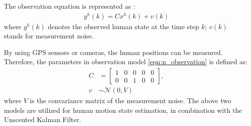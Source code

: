 \documentclass[letterpaper, 10 pt, conference]{ieeeconf}
\begin{document}
	
	
	
	
	
	
	The observation equation is represented as : 
	\begin{subequations}
		\begin{align}
			y^h(k)=Cx^h(k)+v(k)\label{eqn:n_observation}
		\end{align}
	\end{subequations}
	where $y^h(k)$ denotes the observed human state at the time step $k$; $v(k)$ stands for measurement noise. 
	
	By using GPS sensors or cameras, the human positions can be measured.
	Therefore, the parameters in observation model \cref{eqn:n_observation} is defined as:
	\begin{subequations}
		\begin{align}
			C&=\left[
			\begin{array}{ccccc}
				1& 0& 0& 0& 0\\
				0& 0& 1& 0& 0
			\end{array}\right],\label{eqn:C}\\
			v&\sim\mathcal{N}(0,V)\label{eqn:meas_noise}
		\end{align}
	\end{subequations}
	where $V$ is the convariance matrix of the measurement noise.
	The above two models are utilized for human motion state estimation, in combination with the Unscented Kalman Filter.
	
	
\end{document}
